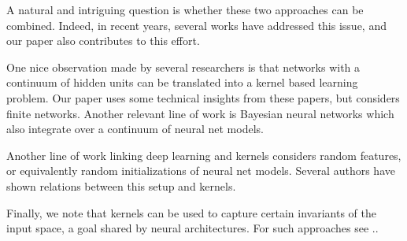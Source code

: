A natural and intriguing question is whether these two approaches can be combined. Indeed, in recent years, several works have addressed this issue, and our paper \cite{heinemann2016improper} also contributes to this effort.

One nice observation made by several researchers \cite{le2007continuous,cho2009kernel} is that networks with a continuum of hidden units can be translated into a kernel based learning problem. Our paper  \cite{heinemann2016improper} uses some technical insights from these papers, but considers finite networks. Another relevant line of work is Bayesian neural networks \cite{neal1995bayesian} which also integrate over a continuum of neural net models.

Another line of work linking deep learning and kernels considers random features, or equivalently random initializations of neural net models. Several authors have shown relations between this setup and kernels\cite{rahimi2007random,giryes2015deep,daniely2016toward}.

Finally, we note that kernels can be used to capture certain invariants of the input space, a goal shared by neural architectures. For such approaches see \cite{bruna2013invariant}..


